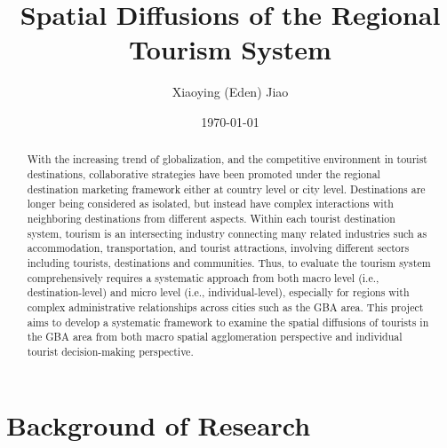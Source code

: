 \documentclass[11pt,a4paper]{amsart}
\theoremstyle{plain}
\theoremstyle{definition}
\begin{document}
\title{S\lowercase{patial} D\lowercase{iffusions of the} R\lowercase{egional} T\lowercase{ourism} S\lowercase{ystem}}
\author{ X\lowercase{iaoying} (E\lowercase{den}) J\lowercase{iao}}
\date{\today}
		
\begin{abstract}
	With the increasing trend of globalization, and the competitive environment in tourist destinations, collaborative strategies have been promoted under the regional destination marketing framework either at country level or city level. Destinations are longer being considered as isolated, but instead have complex interactions with neighboring destinations from different aspects. Within each tourist destination system, tourism is an intersecting industry connecting many related industries such as accommodation, transportation, and tourist attractions, involving different sectors including tourists, destinations and communities. Thus, to evaluate the tourism system comprehensively requires a systematic approach from both macro level (i.e., destination-level) and micro level (i.e., individual-level), especially for regions with complex administrative relationships across cities such as the GBA area. This project aims to develop a systematic framework to examine the spatial diffusions of tourists in the GBA area from both macro spatial agglomeration perspective and individual tourist decision-making perspective.
\end{abstract}
		
\maketitle

\tableofcontents
\newpage

\section{Background of Research}
\end{document}
